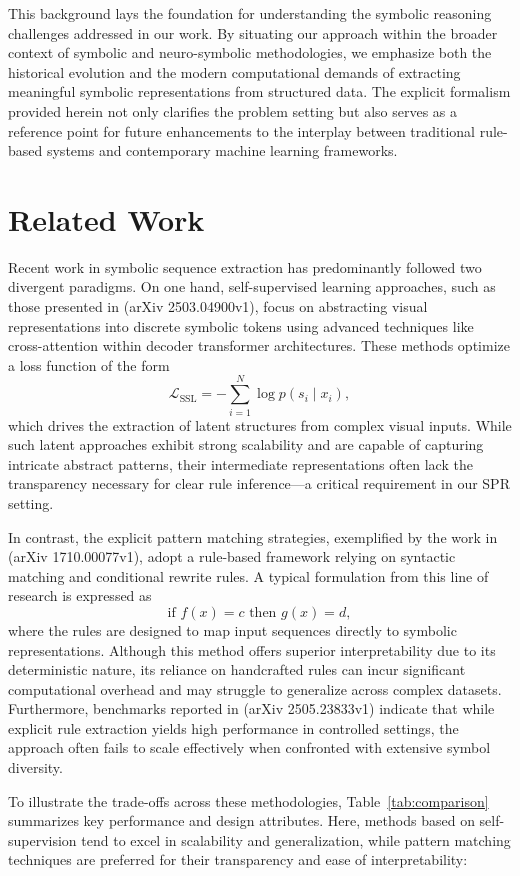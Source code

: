 \documentclass{article}
\begin{document}
This background lays the foundation for understanding the symbolic reasoning challenges addressed in our work. By situating our approach within the broader context of symbolic and neuro-symbolic methodologies, we emphasize both the historical evolution and the modern computational demands of extracting meaningful symbolic representations from structured data. The explicit formalism provided herein not only clarifies the problem setting but also serves as a reference point for future enhancements to the interplay between traditional rule-based systems and contemporary machine learning frameworks.

\section{Related Work}
Recent work in symbolic sequence extraction has predominantly followed two divergent paradigms. On one hand, self-supervised learning approaches, such as those presented in (arXiv 2503.04900v1), focus on abstracting visual representations into discrete symbolic tokens using advanced techniques like cross-attention within decoder transformer architectures. These methods optimize a loss function of the form 
\[
\mathcal{L}_{\mathrm{SSL}} = -\sum_{i=1}^{N} \log p(s_i \mid x_i),
\]
which drives the extraction of latent structures from complex visual inputs. While such latent approaches exhibit strong scalability and are capable of capturing intricate abstract patterns, their intermediate representations often lack the transparency necessary for clear rule inference—a critical requirement in our SPR setting.

In contrast, the explicit pattern matching strategies, exemplified by the work in (arXiv 1710.00077v1), adopt a rule-based framework relying on syntactic matching and conditional rewrite rules. A typical formulation from this line of research is expressed as 
\[
\text{if } f(x) = c \text{ then } g(x) = d,
\]
where the rules are designed to map input sequences directly to symbolic representations. Although this method offers superior interpretability due to its deterministic nature, its reliance on handcrafted rules can incur significant computational overhead and may struggle to generalize across complex datasets. Furthermore, benchmarks reported in (arXiv 2505.23833v1) indicate that while explicit rule extraction yields high performance in controlled settings, the approach often fails to scale effectively when confronted with extensive symbol diversity.

To illustrate the trade-offs across these methodologies, Table~\ref{tab:comparison} summarizes key performance and design attributes. Here, methods based on self-supervision tend to excel in scalability and generalization, while pattern matching techniques are preferred for their transparency and ease of interpretability:
\end{document}
